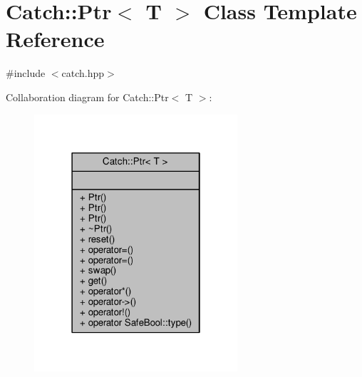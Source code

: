 \hypertarget{class_catch_1_1_ptr}{\section{Catch\-:\-:Ptr$<$ T $>$ Class Template Reference}
\label{class_catch_1_1_ptr}
}


{\ttfamily \#include $<$catch.\-hpp$>$}



Collaboration diagram for Catch\-:\-:Ptr$<$ T $>$\-:
\nopagebreak
\begin{figure}[H]
\begin{center}
\leavevmode
\includegraphics[width=214pt]{class_catch_1_1_ptr__coll__graph}
\end{center}
\end{figure}
